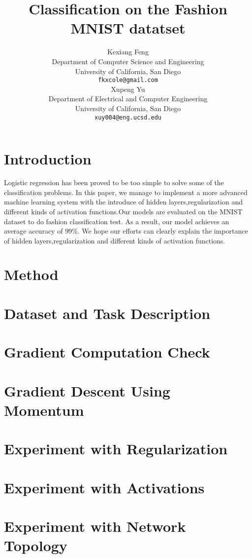 \documentclass{article} %
\title{Classification on the Fashion MNIST datatset}
\author{
Kexiang Feng \\
Department of Computer Science and Engineering\\
University of California, San Diego\\
\texttt{fkxcole@gmail.com} \\
\And
Xupeng Yu \\
Department of Electrical and Computer Engineering \\
University of California, San Diego \\
\texttt{xuy004@eng.ucsd.edu}
}
\begin{document}
\maketitle

\begin{abstract}
	
\end{abstract}
\section{Introduction}
Logistic regression has been proved to be too simple to solve some of the classification problems. In this paper, we manage to implement a more advanced machine learning system with the introduce of hidden layers,regularization and different kinds of activation functions.Our models are evaluated on the MNIST dataset to do fashion classification test. As a result, our model  achieves an average accuracy of $ 99\% $. We hope our efforts can clearly explain the importance of hidden layers,regularization and different kinds of activation functions.
\section{Method}
\section{Dataset and Task Description}
\section{Gradient Computation Check}
\section{Gradient Descent Using Momentum}
\section{Experiment with Regularization}
\section{Experiment with Activations}
\section{Experiment with Network Topology}
\end{document}
